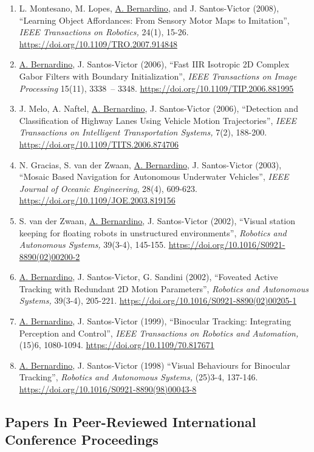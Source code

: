 \documentclass[
]{article}
\begin{document}
\begin{enumerate}
{  Recognition Letters,} 30(1), 18-26.
  \url{https://doi.org/10.1016/j.patrec.2008.08.012}
\item
  L. Montesano, M. Lopes, \ul{A. Bernardino}, and J. Santos-Victor
  (2008), ``Learning Object Affordances: From Sensory Motor Maps to
  Imitation'', \emph{IEEE Transactions on Robotics,} 24(1), 15-26.
  \url{https://doi.org/10.1109/TRO.2007.914848}
\item
  \ul{A. Bernardino}, J. Santos-Victor (2006), ``Fast IIR Isotropic 2D
  Complex Gabor Filters with Boundary Initialization'', \emph{IEEE
  Transactions on Image Processing} 15(11), 3338~-- 3348.
  \url{https://doi.org/10.1109/TIP.2006.881995}
\item
  J. Melo, A. Naftel, \ul{A. Bernardino}, J. Santos-Victor (2006),
  ``Detection and Classification of Highway Lanes Using Vehicle Motion
  Trajectories'', \emph{IEEE Transactions on Intelligent Transportation
  Systems,} 7(2), 188-200.
  \url{https://doi.org/10.1109/TITS.2006.874706}
\item
  N. Gracias, S. van der Zwaan, \ul{A. Bernardino}, J. Santos-Victor
  (2003), ``Mosaic Based Navigation for Autonomous Underwater
  Vehicles'', \emph{IEEE Journal of Oceanic Engineering}, 28(4),
  609-623. \url{https://doi.org/10.1109/JOE.2003.819156}
\item
  S. van der Zwaan, \ul{A. Bernardino}, J. Santos-Victor (2002),
  ``Visual station keeping for floating robots in unstructured
  environments'', \emph{Robotics and Autonomous Systems,} 39(3-4),
  145-155. \url{https://doi.org/10.1016/S0921-8890(02)00200-2}
\item
  \ul{A. Bernardino}, J. Santos-Victor, G. Sandini (2002), ``Foveated
  Active Tracking with Redundant 2D Motion Parameters'', \emph{Robotics
  and Autonomous Systems,} 39(3-4), 205-221.
  \url{https://doi.org/10.1016/S0921-8890(02)00205-1}
\item
  \ul{A. Bernardino}, J. Santos-Victor (1999), ``Binocular Tracking:
  Integrating Perception and Control'', \emph{IEEE Transactions on
  Robotics and Automation,} (15)6, 1080-1094.
  \url{https://doi.org/10.1109/70.817671}
\item
  \ul{A. Bernardino}, J. Santos-Victor (1998) ``Visual Behaviours for
  Binocular Tracking'', \emph{Robotics and Autonomous Systems,} (25)3-4,
  137-146. \url{https://doi.org/10.1016/S0921-8890(98)00043-8}
\end{enumerate}

\subsection{Papers In Peer-Reviewed International Conference
Proceedings}\label{papers-in-peer-reviewed-international-conference-proceedings}
\end{document}
